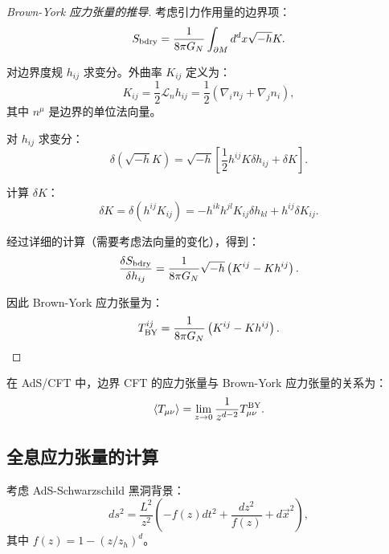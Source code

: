 \begin{proof}[Brown-York 应力张量的推导]
考虑引力作用量的边界项：
\begin{equation}
    S_{\rm bdry} = \frac{1}{8\pi G_N} \int_{\partial M} d^d x \sqrt{-h} K.
\end{equation}

对边界度规 $h_{ij}$ 求变分。外曲率 $K_{ij}$ 定义为：
\begin{equation}
    K_{ij} = \frac{1}{2} \mathcal{L}_n h_{ij} = \frac{1}{2} \left(\nabla_i n_j + \nabla_j n_i\right),
\end{equation}
其中 $n^\mu$ 是边界的单位法向量。

对 $h_{ij}$ 求变分：
\begin{equation}
    \delta (\sqrt{-h} K) = \sqrt{-h} \left[\frac{1}{2} h^{ij} K \delta h_{ij} + \delta K\right].
\end{equation}

计算 $\delta K$：
\begin{equation}
    \delta K = \delta (h^{ij} K_{ij}) = -h^{ik} h^{jl} K_{ij} \delta h_{kl} + h^{ij} \delta K_{ij}.
\end{equation}

经过详细的计算（需要考虑法向量的变化），得到：
\begin{equation}
    \frac{\delta S_{\rm bdry}}{\delta h_{ij}} = \frac{1}{8\pi G_N} \sqrt{-h} \left(K^{ij} - K h^{ij}\right).
\end{equation}

因此 Brown-York 应力张量为：
\begin{equation}
    T^{ij}_{\rm BY} = \frac{1}{8\pi G_N} \left(K^{ij} - K h^{ij}\right).
\end{equation}
\end{proof}

在 AdS/CFT 中，边界 CFT 的应力张量与 Brown-York 应力张量的关系为：
\begin{equation}
    \langle T_{\mu\nu} \rangle = \lim_{z \to 0} \frac{1}{z^{d-2}} T^{\rm BY}_{\mu\nu}.
\end{equation}

\subsection{全息应力张量的计算}

考虑 AdS-Schwarzschild 黑洞背景\cite{deHaro2000}：
\begin{equation}
    ds^2 = \frac{L^2}{z^2} \left(-f(z) dt^2 + \frac{dz^2}{f(z)} + d\vec{x}^2\right),
\end{equation}
其中 $f(z) = 1 - (z/z_h)^d$。

